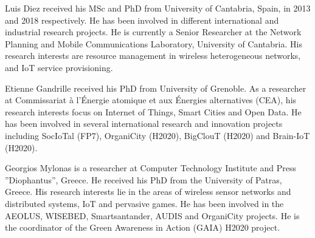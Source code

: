 \documentclass[journal]{IEEEtran}
\begin{document}
\vspace{-7ex}
\begin{IEEEbiography}{Luis Diez}
received his MSc and PhD from University of Cantabria, Spain, in 2013 and 2018 respectively. He has been involved in different international and industrial research projects. He is currently a Senior Researcher at the Network Planning and Mobile Communications Laboratory, University of Cantabria. His research interests are resource management in wireless heterogeneous networks, and IoT service provisioning.
\end{IEEEbiography}
\vspace{-7ex}
\begin{IEEEbiography}{Etienne Gandrille}
received his PhD from University of Grenoble. As a researcher at Commissariat à l'\'{E}nergie atomique et aux \'{E}nergies alternatives (CEA), his research interests focus on Internet of Things, Smart Cities and Open Data. He has been involved in several international research and innovation projects including SocIoTal (FP7), OrganiCity (H2020), BigClouT (H2020) and Brain-IoT (H2020).
\end{IEEEbiography}
\vspace{-7ex}
\begin{IEEEbiography}{Georgios Mylonas}
is a researcher at Computer Technology Institute and Press ''Diophantus'', Greece. He received his PhD from the University of Patras, Greece. His research interests lie in the areas of wireless sensor networks and distributed systems, IoT and pervasive games. He has been involved in the AEOLUS, WISEBED, Smartsantander, AUDIS and OrganiCity projects. He is the coordinator of the Green Awareness in Action (GAIA) H2020 project.
\end{IEEEbiography}
\end{document}
